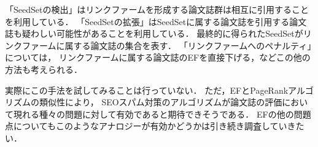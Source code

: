 「SeedSetの検出」はリンクファームを形成する論文誌群は相互に引用することを利用している．
「SeedSetの拡張」はSeedSetに属する論文誌を引用する論文誌も疑わしい可能性があることを利用している．
最終的に得られたSeedSetがリンクファームに属する論文誌の集合を表す．
「リンクファームへのペナルティ」については，
リンクファームに属する論文誌のEFを直接下げる，などこの他の方法も考えられる．
\par
実際にこの手法を試してみることは行っていない．
ただ，EFとPageRankアルゴリズムの類似性により，
SEOスパム対策のアルゴリズムが論文誌の評価において現れる種々の問題に対して有効であると期待できそうである．
EFの他の問題点についてもこのようなアナロジーが有効かどうかは引き続き調査していきたい．

